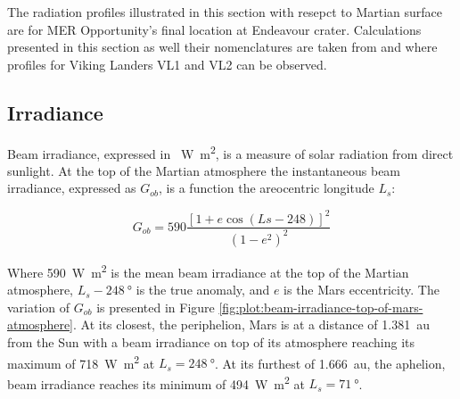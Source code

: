 
The radiation profiles illustrated in this section with resepct to Martian surface are for MER Opportunity's final location at Endeavour crater. Calculations presented in this section as well their nomenclatures are taken from  and  where profiles for Viking Landers VL1 and VL2 can be observed.

\subsection{Irradiance}
\label{sec:MartianEnvironment:SolarRadiation:Irradiance}

Beam irradiance, expressed in \SI{}{\watt\meter\squared}, is a measure of solar radiation from direct sunlight. At the top of the Martian atmosphere the instantaneous beam irradiance, expressed as $G_{ob}$, is a function the areocentric longitude $L_{s}$:

\begin{equation}
  \label{eq:G_ob}
  G_{ob} = 590 \frac{[1 + e \cos{(Ls - 248)}]^2}{(1-e^2)^2}
\end{equation}

Where \SI{590}{\watt\meter\squared} is the mean beam irradiance at the top of the Martian atmosphere, $L_{s} - \SI{248}{\degree}$ is the true anomaly, and $e$ is the Mars eccentricity. The variation of $G_{ob}$ is presented in Figure \ref{fig:plot:beam-irradiance-top-of-mars-atmosphere}. At its closest, the periphelion, Mars is at a distance of \SI{1.381}{\astronomicalunit} from the Sun with a beam irradiance on top of its atmosphere reaching its maximum of \SI{718}{\watt\meter\squared} at $L_{s} = \SI{248}{\degree}$. At its furthest of \SI{1.666}{\astronomicalunit}, the aphelion, beam irradiance reaches its minimum of \SI{494}{\watt\meter\squared} at $L_{s} = \SI{71}{\degree}$.

